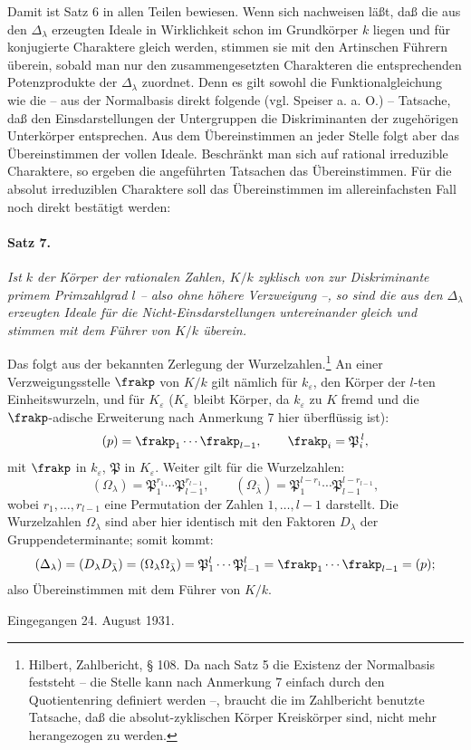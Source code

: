 Damit ist Satz 6 in allen Teilen bewiesen. Wenn sich nachweisen läßt, daß die aus den \(\Delta_\lambda\) erzeugten Ideale in Wirklichkeit schon im Grundkörper \(k\) liegen und für konjugierte Charaktere gleich werden, stimmen sie mit den Artinschen Führern überein, sobald man nur den zusammengesetzten Charakteren die entsprechenden Potenzprodukte der \(\Delta_\lambda\) zuordnet. Denn es gilt sowohl die Funktionalgleichung wie die -- aus der Normalbasis direkt folgende (vgl. Speiser a. a. O.) -- Tatsache, daß den Einsdarstellungen der Untergruppen die Diskriminanten der zugehörigen Unterkörper entsprechen. Aus dem Übereinstimmen an jeder Stelle folgt aber das Übereinstimmen der vollen Ideale. Beschränkt man sich auf rational irreduzible Charaktere, so ergeben die angeführten Tatsachen das Übereinstimmen. Für die absolut irreduziblen Charaktere soll das Übereinstimmen im allereinfachsten Fall noch direkt bestätigt werden:

\paragraph{Satz 7.}
\emph{Ist \(k\) der Körper der rationalen Zahlen, \(K/k\) zyklisch von zur Diskriminante primem Primzahlgrad \(l\) -- also ohne höhere Verzweigung --, so sind die aus den \(\Delta_\lambda\) erzeugten Ideale für die Nicht-Einsdarstellungen untereinander gleich und stimmen mit dem Führer von \(K/k\) überein.}

Das folgt aus der bekannten Zerlegung der Wurzelzahlen.\footnote{Hilbert, Zahlbericht, § 108. Da nach Satz 5 die Existenz der Normalbasis feststeht -- die Stelle kann nach Anmerkung 7 einfach durch den Quotientenring definiert werden --, braucht die im Zahlbericht benutzte Tatsache, daß die absolut-zyklischen Körper Kreiskörper sind, nicht mehr herangezogen zu werden.} An einer Verzweigungsstelle \(\frakp\) von \(K/k\) gilt nämlich für \(k_\varepsilon\), den Körper der \(l\)-ten Einheitswurzeln, und für \(K_\varepsilon\) (\(K_\varepsilon\) bleibt Körper, da \(k_\varepsilon\) zu \(K\) fremd und die \(\frakp\)-adische Erweiterung nach Anmerkung 7 hier überflüssig ist):
\[
        (p)=\frakp_1\cdots\frakp_{l-1},
        \qquad
        \frakp_i=\mathfrak P_i^{\,l},
\]
mit \(\frakp\) in \(k_\varepsilon\), \(\mathfrak P\) in \(K_\varepsilon\). Weiter gilt für die Wurzelzahlen:
\[
        (\Omega_\lambda)=\mathfrak P_1^{r_1}\cdots\mathfrak P_{l-1}^{r_{l-1}},
        \qquad
        (\Omega_{\bar\lambda})=
        \mathfrak P_1^{l-r_1}\cdots\mathfrak P_{l-1}^{l-r_{l-1}},
\]
wobei \(r_1,\ldots,r_{l-1}\) eine Permutation der Zahlen \(1,\ldots,l-1\) darstellt. Die Wurzelzahlen \(\Omega_\lambda\) sind aber hier identisch mit den Faktoren \(D_\lambda\) der Gruppendeterminante; somit kommt:
\[
        (\Delta_\lambda)=(D_\lambda D_{\bar\lambda})
        =(\Omega_\lambda\Omega_{\bar\lambda})
        =\mathfrak P_1^{l}\cdots\mathfrak P_{l-1}^{l}
        =\frakp_1\cdots\frakp_{l-1}=(p);
\]
also Übereinstimmen mit dem Führer von \(K/k\).

\begin{center}
Eingegangen 24. August 1931.
\end{center}


\clearpage
\setcounter{footnote}{0}

\setcounter{footnote}{0}
